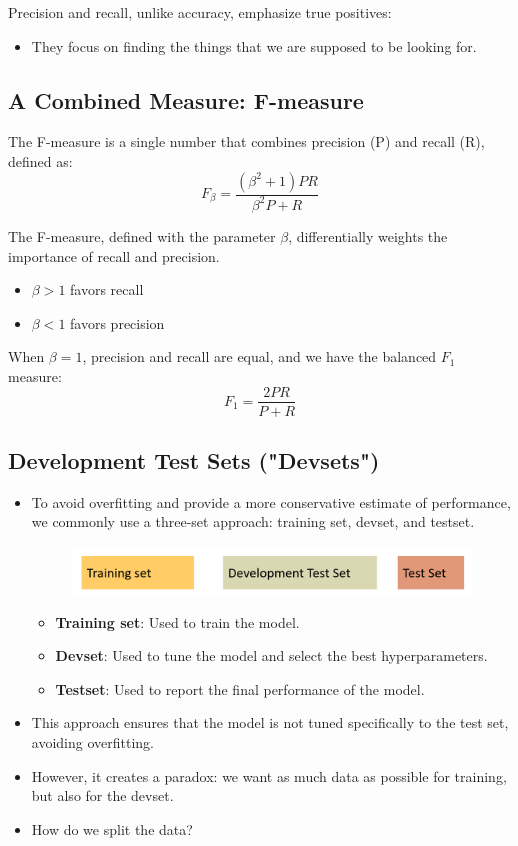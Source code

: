 Precision and recall, unlike accuracy, emphasize true positives:
\begin{itemize}
  \item They focus on finding the things that we are supposed to be looking for.
\end{itemize}




\subsection{A Combined Measure: F-measure}
The F-measure is a single number that combines precision (P) and recall (R), defined as:
\[
F_\beta = \frac{(\beta^2+1)PR}{\beta^2P + R}
\]

The F-measure, defined with the parameter $\beta$, differentially weights the importance of recall and precision. 
\begin{itemize}
  \item $\beta > 1$ favors recall
  \item $\beta < 1$ favors precision
\end{itemize}

When $\beta = 1$, precision and recall are equal, and we have the balanced $F_1$ measure:
\[
F_1 = \frac{2PR}{P + R}
\]


\subsection{Development Test Sets ("Devsets")}


\begin{itemize}
 \item To avoid overfitting and provide a more conservative estimate of performance, we commonly use a three-set approach: training set, devset, and testset.
\begin{figure}[h]
\includegraphics[scale = 0.23]{pics/devsets.png}
\end{figure}

\begin{itemize}
\item \textbf{Training set}: Used to train the model.
\item \textbf{Devset}: Used to tune the model and select the best hyperparameters.
\item \textbf{Testset}: Used to report the final performance of the model.
\end{itemize}


\item This approach ensures that the model is not tuned specifically to the test set, avoiding overfitting.
\item However, it creates a paradox: we want as much data as possible for training, but also for the devset.
\item How do we split the data?

\end{itemize}






